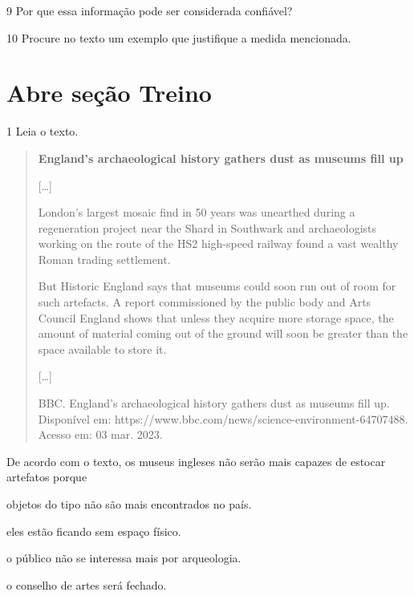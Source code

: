 \linhas[3]


\num{9} Por que essa informação pode ser considerada confiável?

\linhas[2]


\num{10} Procure no texto um exemplo que justifique a medida mencionada.

\linhas[2]


\section{Abre seção Treino}

\num{1} Leia o texto.

\begin{quote}
\textbf{England's archaeological history gathers dust as museums fill up}

{[}\ldots{}{]}

London's largest mosaic find in 50 years was unearthed during a
regeneration project near the Shard in Southwark and archaeologists
working on the route of the HS2 high-speed railway found a vast wealthy
Roman trading settlement.

But Historic England says that museums could soon run out of room for
such artefacts. A report commissioned by the public body and Arts
Council England shows that unless they acquire more storage space, the
amount of material coming out of the ground will soon be greater than
the space available to store it.

{[}\ldots{}{]}

BBC. England's archaeological history gathers dust as museums fill up.
Disponível em: https://www.bbc.com/news/science-environment-64707488.
Acesso em: 03 mar. 2023.
\end{quote}

De acordo com o texto, os museus ingleses não serão mais capazes de
estocar artefatos porque

\begin{escolha}
\item objetos do tipo não são mais encontrados no país.

\item eles estão ficando sem espaço físico.

\item o público não se interessa mais por arqueologia.

\item o conselho de artes será fechado.
\end{escolha}

